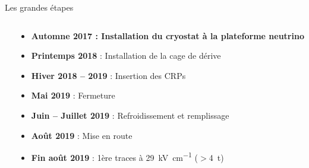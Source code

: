 \begin{frame}{Les grandes étapes}
\begin{columns}
\begin{column}{0.4\textwidth}
            \end{column}\hfill
            \begin{column}{0.55\textwidth}
                \begin{itemize}
                    \item \textbf{Automne 2017 : Installation du cryostat à la plateforme neutrino}
                    \item\textbf{Printemps 2018} : Installation de la cage de dérive
                    \item \textbf{Hiver 2018 -- 2019} : Insertion des CRPs
                    \item \textbf{Mai 2019} : Fermeture
                    \item \textbf{Juin -- Juillet 2019} : Refroidissement et remplissage 
                    \item \textbf{Août 2019} : Mise en route
                    \item \textbf{Fin août 2019} : 1ère traces à \SI{29}{\kilo\volt\per\centi\meter} ($>$\SI{4}{\tonne})
                \end{itemize}
            \end{column}
        \end{columns}
    \end{frame}
    
    {
       	\setlength\pdfpagewidth{12.8cm}%
       	\setlength\pdfpageheight{6.75cm}%
       \begin{frame}[plain]
             	
       \end{frame}
     }

